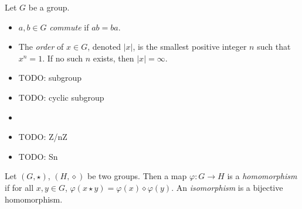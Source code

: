     \begin{defn} \label{def_group_misc}
        Let $G$ be a group. \begin{itemize}
        \item $a,b \in G$ \emph{commute} if $ab=ba$.
        \item The \emph{order} of $x \in G$, denoted $|x|$, is the smallest positive integer $n$ such that $x^n=1$. If no such $n$ exists, then $|x|=\infty$.
        \item TODO: subgroup
        \item TODO: cyclic subgroup
    \end{itemize} \end{defn}
    
    \begin{defn} \label{def_group_example} \begin{itemize}
        \item[]
        \item TODO: Z/nZ
        \item TODO: Sn
    \end{itemize} \end{defn}
    
    \begin{defn} \label{def_group_homomorphism}
        Let $(G,\star)$, $(H,\diamond)$ be two groups. Then a map $\varphi: G \to H$ is a \emph{homomorphism} if for all $x,y \in G$, $\varphi(x \star y)=\varphi(x) \diamond \varphi(y)$. An \emph{isomorphism} is a bijective homomorphism.
    \end{defn}

